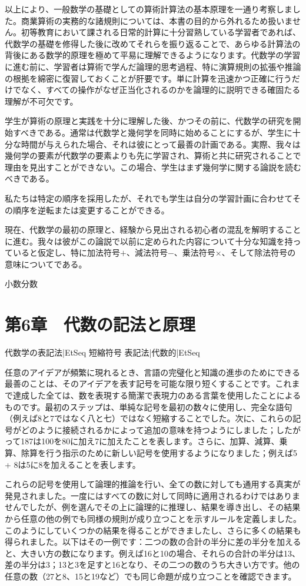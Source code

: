 \documentclass[a4paper,11pt,openany]{ltjsbook}
\begin{document}
以上により、一般数学の基礎としての算術計算法の基本原理を一通り考察しました。商業算術の実務的な諸規則については、本書の目的から外れるため扱いません。初等教育において課される日常的計算に十分習熟している学習者であれば、代数学の基礎を修得した後に改めてそれらを振り返ることで、あらゆる計算法の背後にある数学的原理を極めて平易に理解できるようになります。代数学の学習に進む前に、学習者は算術で学んだ論理的思考過程、特に演算規則の拡張や推論の根拠を綿密に復習しておくことが肝要です。単に計算を迅速かつ正確に行うだけでなく、すべての操作がなぜ正当化されるのかを論理的に説明できる確固たる理解が不可欠です。

学生が算術の原理と実践を十分に理解した後、かつその前に、代数学の研究を開始すべきである。通常は代数学と幾何学を同時に始めることにするが、学生に十分な時間が与えられた場合、それは彼にとって最善の計画である。実際、我々は幾何学の要素が代数学の要素よりも先に学習され、算術と共に研究されることで理由を見出すことができない。この場合、学生はまず幾何学に関する論説を読むべきである。

私たちは特定の順序を採用したが、それでも学生は自分の学習計画に合わせてその順序を逆転または変更することができる。

現在、代数学の最初の原理と、経験から見出される初心者の混乱を解明することに進む。我々は彼がこの論説で以前に定められた内容について十分な知識を持っていると仮定し、特に加法符号$+$、減法符号$-$、乗法符号$×$、そして除法符号の意味についてである。

小数分数

\chapter{第6章　代数の記法と原理}

代数学の表記法|EtSeq
短縮符号
表記法|代数的|EtSeq

任意のアイデアが頻繁に現れるとき、言語の完璧化と知識の進歩のためにできる最善のことは、そのアイデアを表す記号を可能な限り短くすることです。これまで達成した全ては、数を表現する簡潔で表現力のある言葉を使用したことによるものです。最初のステップは、単純な記号を最初の数々に使用し、完全な語句（例えば8と7ではなく八と七）ではなく短縮することでした。次に、これらの記号がどのように接続されるかによって追加の意味を持つようにしました；したがって187は100を80に加え7に加えたことを表します。さらに、加算、減算、乗算、除算を行う指示のために新しい記号を使用するようになりました；例えば5 + 8は5に8を加えることを表します。

これらの記号を使用して論理的推論を行い、全ての数に対しても通用する真実が発見されました。一度にはすべての数に対して同時に適用されるわけではありませんでしたが、例を選んでその上に論理的に推理し、結果を導き出し、その結果から任意の他の例でも同様の規則が成り立つことを示すルールを定義しました。このようにしていくつかの結果を得ることができましたし、さらに多くの結果も得られました。以下はその一例です：二つの数の合計の半分に差の半分を加えると、大きい方の数になります。例えば16と10の場合、それらの合計の半分は13、差の半分は3；13と3を足すと16となり、その二つの数のうち大きい方です。他の任意の数（27と8、15と19など）でも同じ命題が成り立つことを確認できます。
\end{document}
